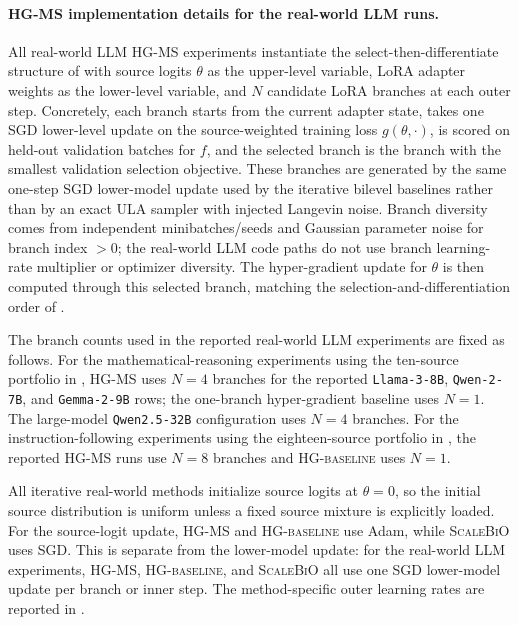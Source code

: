 \documentclass{article}
\theoremstyle{normaltheorem}
\begin{document}
\paragraph{HG-MS implementation details for the real-world LLM runs.}
All real-world LLM \textsc{HG-MS} experiments instantiate the select-then-differentiate structure of
 with source logits \(\theta\) as the upper-level variable, LoRA adapter weights as the
lower-level variable, and \(N\) candidate LoRA branches at each outer step. Concretely, each branch starts from the
current adapter state, takes one SGD lower-level update on the source-weighted training loss \(g(\theta,\cdot)\), is scored on
held-out validation batches for \(f\), and the selected branch is the branch with the smallest validation selection
objective. These branches are generated by the same one-step SGD lower-model update used by the iterative bilevel baselines
rather than by an exact ULA sampler with injected Langevin noise. Branch diversity comes from independent minibatches/seeds and Gaussian parameter
noise for branch index \(>0\); the real-world LLM code paths do not use branch learning-rate multiplier or optimizer
diversity. The hyper-gradient update for \(\theta\) is then computed through this selected branch, matching the
selection-and-differentiation order of .

The branch counts used in the reported real-world LLM experiments are fixed as follows. For the mathematical-reasoning
experiments using the ten-source portfolio in , \textsc{HG-MS} uses \(N=4\) branches for
the reported \texttt{Llama-3-8B}, \texttt{Qwen-2-7B}, and \texttt{Gemma-2-9B} rows; the one-branch hyper-gradient baseline
uses \(N=1\). The large-model \texttt{Qwen2.5-32B} configuration uses \(N=4\) branches. For the instruction-following
experiments using the eighteen-source portfolio in , the reported \textsc{HG-MS} runs
use \(N=8\) branches and \textsc{HG-baseline} uses \(N=1\).

All iterative real-world methods initialize source logits at \(\theta=0\), so the initial source distribution is uniform
unless a fixed source mixture is explicitly loaded. For the source-logit update, \textsc{HG-MS} and
\textsc{HG-baseline} use Adam, while \textsc{ScaleBiO} uses SGD. This is separate from the lower-model update: for the
real-world LLM experiments, \textsc{HG-MS}, \textsc{HG-baseline}, and \textsc{ScaleBiO} all use one SGD lower-model update
per branch or inner step. The method-specific outer learning rates are reported in
.
\end{document}
